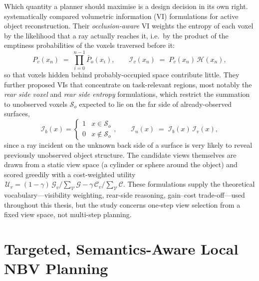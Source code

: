 Which quantity a planner should maximise is a design decision in its own
right. \textcite{delmerico2018} systematically compared volumetric
information (VI) formulations for active object reconstruction. Their
\emph{occlusion-aware} VI weights the entropy of each voxel by the
likelihood that a ray actually reaches it, i.e.\ by the product of the
emptiness probabilities of the voxels traversed before it:
%
\begin{equation}
  P_v(x_n) \;=\; \prod_{i=0}^{n-1} \bar{P}_o(x_i),
  \qquad
  \mathcal{I}_v(x_n) \;=\; P_v(x_n)\, \mathcal{H}(x_n),
  \label{eq:rw-delmerico-oa}
\end{equation}
%
so that voxels hidden behind probably-occupied space contribute little.
They further proposed VIs that concentrate on task-relevant regions,
most notably the \emph{rear side voxel} and \emph{rear side entropy}
formulations, which restrict the summation to unobserved voxels
$\mathcal{S}_o$ expected to lie on the far side of already-observed
surfaces,
%
\begin{equation}
  \mathcal{I}_b(x) =
  \begin{cases}
    1 & x \in \mathcal{S}_o \\
    0 & x \notin \mathcal{S}_o
  \end{cases},
  \qquad
  \mathcal{I}_n(x) \;=\; \mathcal{I}_b(x)\,\mathcal{I}_v(x),
  \label{eq:rw-delmerico-rse}
\end{equation}
%
since a ray incident on the unknown back side of a surface is very
likely to reveal previously unobserved object structure. The candidate
views themselves are drawn from a static view space (a cylinder or
sphere around the object) and scored greedily with a cost-weighted
utility $\,\mathcal{U}_v = (1-\gamma)\,\mathcal{G}_v / \sum_\mathcal{V}
\mathcal{G} - \gamma\, \mathcal{C}_v / \sum_\mathcal{V} \mathcal{C}$.
These formulations supply the theoretical vocabulary---visibility
weighting, rear-side reasoning, gain--cost trade-off---used throughout
this thesis, but the study concerns one-step view selection from a fixed
view space, not multi-step planning.

\section{Targeted, Semantics-Aware Local NBV Planning}
\label{sec:rw-gradient-nbv}

